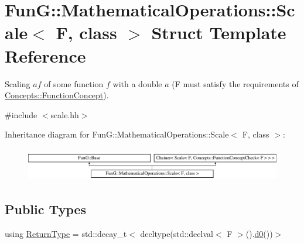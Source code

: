 \hypertarget{structFunG_1_1MathematicalOperations_1_1Scale}{}\section{Fun\+G\+:\+:Mathematical\+Operations\+:\+:Scale$<$ F, class $>$ Struct Template Reference}
\label{structFunG_1_1MathematicalOperations_1_1Scale}


Scaling $ af $ of some function $ f $ with a double $ a $ (F must satisfy the requirements of \hyperlink{structFunG_1_1Concepts_1_1FunctionConcept}{Concepts\+::\+Function\+Concept}).  




{\ttfamily \#include $<$scale.\+hh$>$}

Inheritance diagram for Fun\+G\+:\+:Mathematical\+Operations\+:\+:Scale$<$ F, class $>$\+:\begin{figure}[H]
\begin{center}
\leavevmode
\includegraphics[height=1.454545cm]{structFunG_1_1MathematicalOperations_1_1Scale}
\end{center}
\end{figure}
\subsection*{Public Types}
\begin{DoxyCompactItemize}
\item 
using \hyperlink{structFunG_1_1MathematicalOperations_1_1Scale_ac8d3f432c36c678cbf156132e46607ae}{Return\+Type} = std\+::decay\+\_\+t$<$ decltype(std\+::declval$<$ F $>$().\hyperlink{structFunG_1_1MathematicalOperations_1_1Scale_aec01731655fabb0f6fcfd06493aec4af}{d0}())$>$
\end{DoxyCompactItemize}
